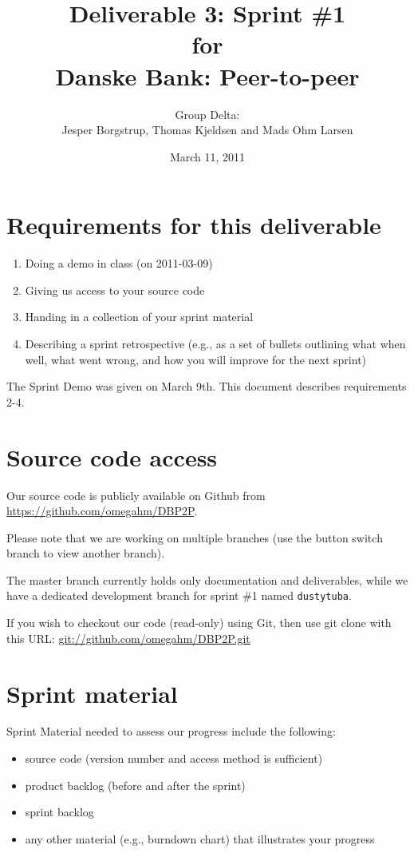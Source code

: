\documentclass[a4paper,11pt]{article}
\title{Deliverable 3: Sprint \#1\\\small{for}\\\small{Danske Bank: Peer-to-peer}}
\author{ Group Delta:\\Jesper Borgstrup, Thomas Kjeldsen and Mads Ohm Larsen }
\date{March 11, 2011}
\begin{document}
\ifpdf
{}
\else
{}
\fi

\maketitle


\section{Requirements for this deliverable}
\begin{enumerate}
\item Doing a demo in class (on 2011-03-09)
\item Giving us access to your source code
\item Handing in a collection of your sprint material
\item Describing a sprint retrospective (e.g., as a set of bullets outlining what
when well, what went wrong, and how you will improve for the next sprint)
\end{enumerate}

The Sprint Demo was given on March 9th. This document describes requirements 2-4.

\section{Source code access}
Our source code is publicly available on Github from \url{https://github.com/omegahm/DBP2P}.

Please note that we are working on multiple branches (use the button switch branch to view another branch).

The master branch currently holds only documentation and deliverables, while we have a dedicated development branch for sprint \#1 named \texttt{dustytuba}.

If you wish to checkout our code (read-only) using Git, then use git clone with this URL:
\url{git://github.com/omegahm/DBP2P.git}


\section{Sprint material}
Sprint Material needed to assess our progress include the following:
\begin{itemize}
\item source code (version number and access method is sufficient)
\item product backlog (before and after the sprint)
\item sprint backlog
\item any other material (e.g., burndown chart) that illustrates your progress
\end{itemize}
\end{document}
